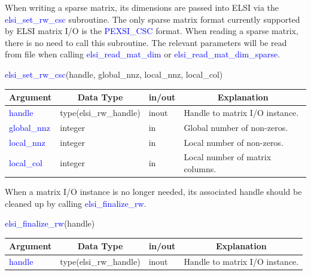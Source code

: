 \documentclass{report}
\newcommand{\tcb}[1]{\textcolor{blue}{#1}}
\begin{document}
When writing a sparse matrix, its dimensions are passed into ELSI via the \tcb{elsi\_set\_rw\_csc} subroutine. The only sparse matrix format currently supported by ELSI matrix I/O is the \tcb{PEXSI\_CSC} format. When reading a sparse matrix, there is no need to call this subroutine. The relevant parameters will be read from file when calling \tcb{elsi\_read\_mat\_dim} or \tcb{elsi\_read\_mat\_dim\_sparse}.

\begin{labeling}{\hspace{6cm}}
\item [\hspace{0.3cm} \tcb{elsi\_set\_rw\_csc}(handle, global\_nnz, local\_nnz, local\_col)]
\end{labeling}

\begin{tabular}[]{|p{20mm}|p{45mm}|p{15mm}|p{85mm}|}
\hline
\multicolumn{1}{|c|}{\textbf{Argument}} & \multicolumn{1}{c|}{\textbf{Data Type}} & \multicolumn{1}{c|}{\textbf{in/out}} & \multicolumn{1}{c|}{\textbf{Explanation}}\\
\hline
\tcb{handle}      & type(elsi\_rw\_handle) & inout & Handle to matrix I/O instance.\\
\hline
\tcb{global\_nnz} & integer                & in    & Global number of non-zeros.\\
\hline
\tcb{local\_nnz}  & integer                & in    & Local number of non-zeros.\\
\hline
\tcb{local\_col}  & integer                & in    & Local number of matrix columns.\\
\hline
\end{tabular}

When a matrix I/O instance is no longer needed, its associated handle should be cleaned up by calling \tcb{elsi\_finalize\_rw}.
\begin{labeling}{\hspace{6cm}}
\item [\hspace{0.3cm} \tcb{elsi\_finalize\_rw}(handle)]
\end{labeling}

\begin{tabular}[]{|p{20mm}|p{45mm}|p{15mm}|p{85mm}|}
\hline
\multicolumn{1}{|c|}{\textbf{Argument}} & \multicolumn{1}{c|}{\textbf{Data Type}} & \multicolumn{1}{c|}{\textbf{in/out}} & \multicolumn{1}{c|}{\textbf{Explanation}}\\
\hline
\tcb{handle} & type(elsi\_rw\_handle) & inout & Handle to matrix I/O instance.\\
\hline
\end{tabular}
\end{document}
